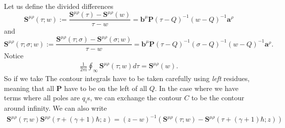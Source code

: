 \documentclass[11pt]{report}
\theoremstyle{definition}
\theoremstyle{remark}
\theoremstyle{remark}
\newcommand{\I}{\mathrm{i}}
\begin{document}
Let us define the divided differences
\begin{equation*}
\mathbf{S}^{\mu\rho}(\tau;w) := \frac{\mathbf{S}^{\mu\rho}(\tau)-\mathbf{S}^{\mu\rho}(w)}{\tau-w} = \mathbf{b}^\mu \mathbf{P} (\tau-Q)^{-1} (w-Q)^{-1} \mathbf{a}^\rho
\end{equation*}
and
\begin{equation*}
\mathbf{S}^{\mu\rho}(\tau;\sigma;w) := \frac{\mathbf{S}^{\mu\rho}(\tau;\sigma)-\mathbf{S}^{\mu\rho}(\sigma;w)}{\tau-w} = \mathbf{b}^\mu \mathbf{P} (\tau-Q)^{-1} (\sigma-Q)^{-1} (w-Q)^{-1} \mathbf{a}^\rho.
\end{equation*}
Notice
\begin{align*}
\frac{1}{2\pi\I} \oint_\infty \mathbf{S}^{\mu\rho}(\tau;w) d\tau = \mathbf{S}^{\mu\rho}(w).
\end{align*}
So if we take 
The contour integrals have to be taken carefully using \emph{left} residues, meaning that all $\mathbf{P}$ have to be on the left of all $Q$. In the case where we have terms where all poles are $q_i$s, we can exchange the contour $C$ to be the contour around infinity. We can also write
\begin{align*}
\mathbf{S}^{\mu\rho}(\tau;w) \mathbf{S}^{\mu\rho}(\tau+(\gamma+1)\hbar;z) = (z-w)^{-1}(\mathbf{S}^{\mu\rho}(\tau;w) - \mathbf{S}^{\mu\rho}(\tau+(\gamma+1)\hbar;z))
\end{align*}
\end{document}
